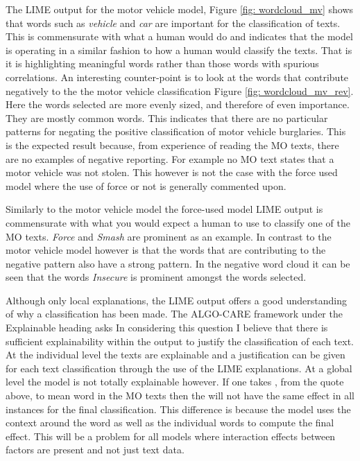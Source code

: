 The LIME output for the motor vehicle model, Figure \ref{fig: wordcloud_mv} shows that words such as \emph{vehicle} and \emph{car} are important for the classification of texts. This is commensurate with what a human would do and indicates that the model is operating in a similar fashion to how a human would classify the texts. That is it is highlighting meaningful words rather than those words with spurious correlations. An interesting counter-point is to look at the words that contribute negatively to the the motor vehicle classification Figure \ref{fig: wordcloud_mv_rev}. Here the words selected are more evenly sized, and therefore of even importance. They are mostly common words. This indicates that there are no particular patterns for negating the positive classification of motor vehicle burglaries. This is the expected result because, from experience of reading the MO texts, there are no examples of negative reporting. For example no MO text states that a motor vehicle was not stolen. This however is not the case with the force used model where the use of force or not is generally commented upon.

Similarly to the motor vehicle model the force-used model LIME output is commensurate with what you would expect a human to use to classify one of the MO texts. \emph{Force} and \emph{Smash} are prominent as an example. In contrast to the motor vehicle model however is that the words that are contributing to the negative pattern also have a strong pattern. In the negative word cloud it can be seen that the words \emph{Insecure} is prominent amongst the words selected.

Although only local explanations, the LIME output offers a good understanding of why a classification has been made. The ALGO-CARE framework under the Explainable heading asks  In considering this question I believe that there is sufficient explainability within the output to justify the classification of each text. At the individual level the texts are explainable and a justification can be given for each text classification through the use of the LIME explanations. At a global level the model is not totally explainable however. If one takes , from the quote above, to mean word in the MO texts then the  will not have the same effect in all instances for the final classification. This difference is because the model uses the context around the word as well as the individual words to compute the final effect. This will be a problem for all models where interaction effects between factors are present and not just text data.

